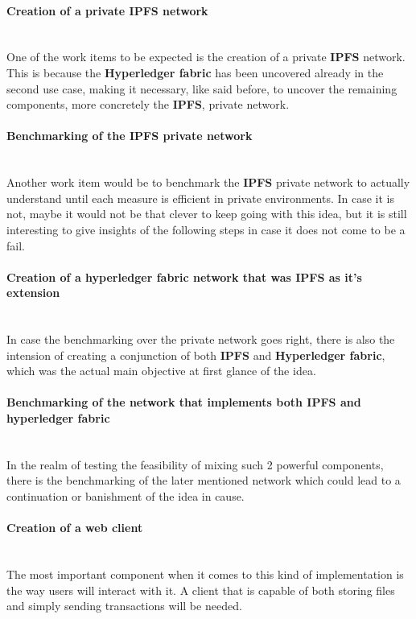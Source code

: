 \paragraph{Creation of a private IPFS network} \mbox{} \\
One of the work items to be expected is the creation of a private \textbf{IPFS} network. This is because the \textbf{Hyperledger fabric} has been uncovered already in the second use case, making it necessary, like said before, to uncover the remaining components, more concretely the \textbf{IPFS}, private network.

\paragraph{Benchmarking of the IPFS private network} \mbox{} \\
Another work item would be to benchmark the \textbf{IPFS} private network to actually understand until each measure is efficient in private environments. In case it is not, maybe it would not be that clever to keep going with this idea, but it is still interesting to give insights of the following steps in case it does not come to be a fail.

\paragraph{Creation of a hyperledger fabric network that was IPFS as it's extension} \mbox{} \\
In case the benchmarking over the private network goes right, there is also the intension of creating a conjunction of both \textbf{IPFS} and \textbf{Hyperledger fabric}, which was the actual main objective at first glance of the idea.

\paragraph{Benchmarking of the network that implements both IPFS and hyperledger fabric} \mbox{} \\
In the realm of testing the feasibility of mixing such 2 powerful components, there is the benchmarking of the later mentioned network which could lead to a continuation or banishment of the idea in cause.

\paragraph{Creation of a web client} \mbox{} \\
The most important component when it comes to this kind of implementation is the way users will interact with it. A client that is capable of both storing files and simply sending transactions will be needed.


